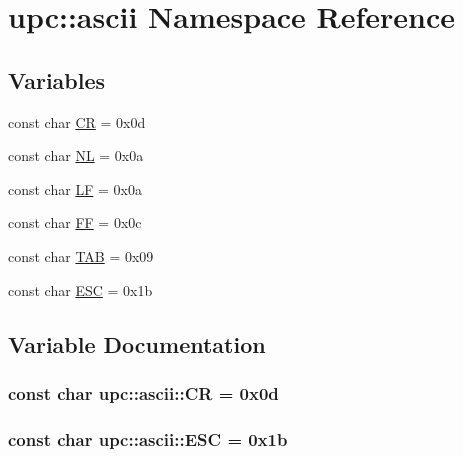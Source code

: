 \hypertarget{namespaceupc_1_1ascii}{}\section{upc\+:\+:ascii Namespace Reference}
\label{namespaceupc_1_1ascii}
\subsection*{Variables}
\begin{DoxyCompactItemize}
\item 
const char \hyperlink{namespaceupc_1_1ascii_a9cd56052c84609b89d09985a4651c436}{CR} = 0x0d
\item 
const char \hyperlink{namespaceupc_1_1ascii_a8c3d9f1660792c0a53398e5cc64f4bcf}{NL} = 0x0a
\item 
const char \hyperlink{namespaceupc_1_1ascii_a628dd589ffd58739bc253012809d38fb}{LF} = 0x0a
\item 
const char \hyperlink{namespaceupc_1_1ascii_af5ddbbb8830f0005861ff0a7c859c062}{FF} = 0x0c
\item 
const char \hyperlink{namespaceupc_1_1ascii_a864f71ae1e9d63e7f14baadb84584e57}{T\+AB} = 0x09
\item 
const char \hyperlink{namespaceupc_1_1ascii_a801ade1e26388b0096aabd57c126a99e}{E\+SC} = 0x1b
\end{DoxyCompactItemize}


\subsection{Variable Documentation}
\subsubsection[{\texorpdfstring{CR}{CR}}]{\setlength{\rightskip}{0pt plus 5cm}const char upc\+::ascii\+::\+CR = 0x0d}\hypertarget{namespaceupc_1_1ascii_a9cd56052c84609b89d09985a4651c436}{}\label{namespaceupc_1_1ascii_a9cd56052c84609b89d09985a4651c436}
\subsubsection[{\texorpdfstring{E\+SC}{ESC}}]{\setlength{\rightskip}{0pt plus 5cm}const char upc\+::ascii\+::\+E\+SC = 0x1b}\hypertarget{namespaceupc_1_1ascii_a801ade1e26388b0096aabd57c126a99e}{}\label{namespaceupc_1_1ascii_a801ade1e26388b0096aabd57c126a99e}
